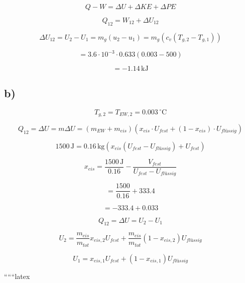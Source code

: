 \[
Q - W = \Delta U + \Delta KE + \Delta PE
\]

\[
Q_{12} = W_{12} + \Delta U_{12}
\]

\[
\Delta U_{12} = U_2 - U_1 = m_g (u_2 - u_1) = m_g \left( c_v (T_{g,2} - T_{g,1}) \right)
\]

\[
= 3.6 \cdot 10^{-3} \cdot 0.633 \left( 0.003 - 500 \right)
\]

\[
= -1.14 \, \text{kJ}
\]

\subsection*{b)}

\[
T_{g,2} = T_{EW,2} = 0.003 \, ^\circ \text{C}
\]

\[
Q_{12} = \Delta U = m \Delta U = (m_{EW} + m_{eis}) \left( x_{eis} \cdot U_{fest} + (1 - x_{eis}) \cdot U_{flüssig} \right)
\]

\[
1500 \, \text{J} = 0.16 \, \text{kg} \left( x_{eis} (U_{fest} - U_{flüssig}) + U_{fest} \right)
\]

\[
x_{eis} = \frac{1500 \, \text{J}}{0.16} - \frac{V_{fest}}{U_{fest} - U_{flüssig}}
\]

\[
= \frac{1500}{0.16} + 333.4
\]

\[
= -333.4 + 0.033
\]

\[
Q_{12} = \Delta U = U_2 - U_1
\]

\[
U_2 = \frac{m_{eis}}{m_{tot}} x_{eis,2} U_{fest} + \frac{m_{eis}}{m_{tot}} (1 - x_{eis,2}) U_{flüssig}
\]

\[
U_1 = x_{eis,1} U_{fest} + (1 - x_{eis,1}) U_{flüssig}
\]

``````latex


